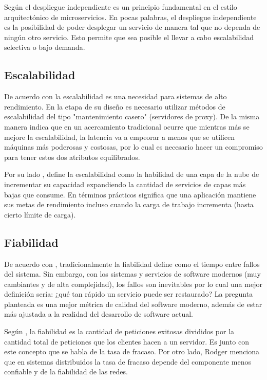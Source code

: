 Según \cite{nadareishvili2016microservice} el despliegue independiente es un principio fundamental
en el estilo arquitectónico de microservicios.
En pocas palabras, el despliegue independiente es la posibilidad de poder desplegar un 
servicio de manera tal que no dependa de ningún otro servicio.
Esto permite que sea posible el llevar a cabo escalabilidad selectiva o bajo demanda.


\subsection{Escalabilidad}

De acuerdo con \cite{rodger2017tao} la escalabilidad es una necesidad para sistemas de alto rendimiento.
En la etapa de su diseño es necesario utilizar métodos de escalabilidad del tipo "mantenimiento casero"
(servidores de proxy).
De la misma manera indica que en un acercamiento tradicional ocurre que mientras más se mejore la 
escalabilidad, la latencia va a empeorar a menos que se utilicen máquinas más poderosas y costosas,
por lo cual es necesario hacer un compromiso para tener estos dos atributos equilibrados.

Por su lado \cite{lehrig2015scalability}, define la escalabilidad como la habilidad de una capa
de la nube de incrementar su capacidad expandiendo la cantidad de servicios de capas más bajas
que consume.
En términos prácticos significa que una aplicación mantiene sus metas de rendimiento incluso cuando
la carga de trabajo incrementa (hasta cierto límite de carga).


\subsection{Fiabilidad}

De acuerdo con \cite{humble2018accelerate}, tradicionalmente la fiabilidad define como el tiempo
entre fallos del sistema.
Sin embargo, con los sistemas y servicios de software modernos (muy cambiantes y de alta complejidad),
los fallos son inevitables por lo cual una mejor definición sería: ¿qué tan rápido un servicio puede
ser restaurado?
La pregunta planteada es una mejor métrica de calidad del software moderno, además de estar más ajustada
a la realidad del desarrollo de software actual.

Según \cite{rodger2017tao}, la fiabilidad es la cantidad de peticiones exitosas divididos
por la cantidad total de peticiones que los clientes hacen a un servidor.
Es junto con este concepto que se habla de la tasa de fracaso.
Por otro lado, Rodger menciona que en sistemas distribuidos la tasa de fracaso depende del
componente menos confiable y de la fiabilidad de las redes.


